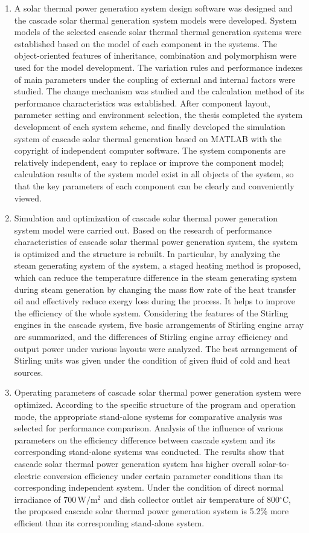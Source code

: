 \begin{enumerate}[label=(\arabic*)]
  \item A solar thermal power generation system design software was designed and the cascade solar thermal generation system models were developed. System models of the selected cascade solar thermal thermal generation systems were established based on the model of each component in the systems. The object-oriented features of inheritance, combination and polymorphism were used for the model development. The variation rules and performance indexes of main parameters under the coupling of external and internal factors were studied. The change mechanism was studied and the calculation method of its performance characteristics was established. After component layout, parameter setting and environment selection, the thesis completed the system development of each system scheme, and finally developed the simulation system of cascade solar thermal generation based on MATLAB with the copyright of independent computer software. The system components are relatively independent, easy to replace or improve the component model; calculation results of the system model exist in all objects of the system, so that the key parameters of each component can be clearly and conveniently viewed. 
  \item Simulation and optimization of cascade solar thermal power generation system model were carried out. Based on the research of performance characteristics of cascade solar thermal power generation system, the system is optimized and the structure is rebuilt. In particular, by analyzing the steam generating system of the system, a staged heating method is proposed, which can reduce the temperature difference in the steam generating system during steam generation by changing the mass flow rate of the heat transfer oil and  effectively reduce exergy loss during the process. It helps to improve the efficiency of the whole system. 
Considering the features of the Stirling engines in the cascade system, five basic arrangements of Stirling engine array are summarized, and the differences of Stirling engine array efficiency and output power under various layouts were analyzed. The best arrangement of Stirling units was given under the condition of given fluid of cold and heat sources.
	\item Operating parameters of cascade solar thermal power generation system were optimized. 
According to the specific structure of the program and operation mode, the appropriate stand-alone systems for comparative analysis was selected for performance comparison. Analysis of the influence of various parameters on the efficiency difference between cascade system and its corresponding stand-alone systems was conducted. The results show that cascade solar thermal power generation system has higher overall solar-to-electric conversion efficiency under certain parameter conditions than its corresponding independent system. Under the condition of direct normal irradiance of 700\,$\mathrm{W/m^2}$ and dish collector outlet air temperature of 800$\mathrm{^\circ C}$, the proposed cascade solar thermal power generation system is 5.2\% more efficient than its corresponding stand-alone system.

\end{enumerate}
